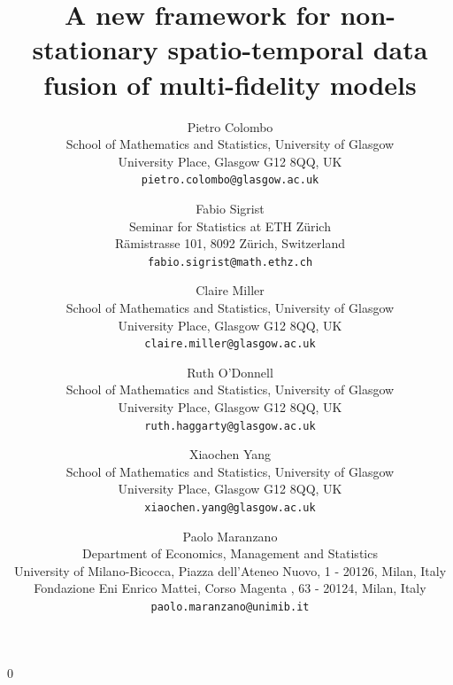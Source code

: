 \documentclass[12pt]{article}
\newcommand{\blind}{0}
\begin{document}
%

\def\spacingset#1{\renewcommand{\baselinestretch}%
{#1}\small\normalsize} \spacingset{1}



\blind
{
  \title{\bf A new framework for non-stationary spatio-temporal data fusion of multi-fidelity models}
\author{Pietro Colombo\\
    School of Mathematics and Statistics, University of Glasgow\\
    University Place, Glasgow G12 8QQ, UK\\
    \texttt{pietro.colombo@glasgow.ac.uk}
    \and
    Fabio Sigrist\\
    Seminar for Statistics at ETH Zürich\\
    Rämistrasse 101, 8092 Zürich, Switzerland\\
    \texttt{fabio.sigrist@math.ethz.ch}
   \and
    Claire Miller\\
    School of Mathematics and Statistics, University of Glasgow\\
    University Place, Glasgow G12 8QQ, UK\\
   \texttt{claire.miller@glasgow.ac.uk}
    \and
    Ruth O’Donnell\\
    School of Mathematics and Statistics, University of Glasgow\\
    University Place, Glasgow G12 8QQ, UK\\
   \texttt{ruth.haggarty@glasgow.ac.uk}
    \and
    Xiaochen Yang\\
    School of Mathematics and Statistics, University of Glasgow\\
   University Place, Glasgow G12 8QQ, UK\\
    \texttt{xiaochen.yang@glasgow.ac.uk}
    \and
     Paolo Maranzano\\
    Department of Economics, Management and Statistics\\
   University of Milano-Bicocca, Piazza dell'Ateneo Nuovo, 1 - 20126, Milan, Italy\\
   Fondazione Eni Enrico Mattei, Corso Magenta , 63 - 20124, Milan, Italy\\
    \texttt{paolo.maranzano@unimib.it}
}

  \maketitle
} \fi
\end{document}
